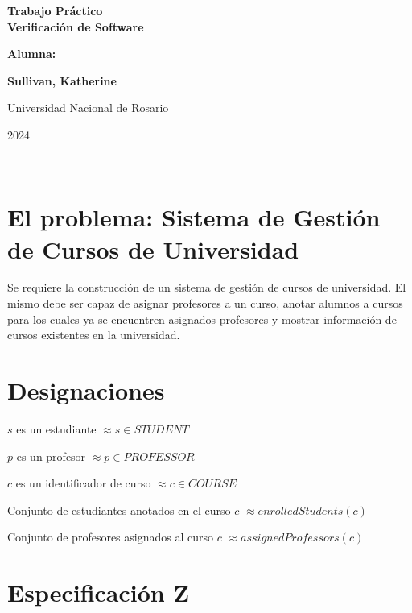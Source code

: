 \documentclass{article}
\newcommand{\desig}[2]{\item #1 $\approx #2$}
\newenvironment{designations}
  {\begin{leftbar}
    \begin{list}{}{\setlength{\labelsep}{0cm}
                   \setlength{\labelwidth}{0cm}
                   \setlength{\listparindent}{0cm}
                   \setlength{\rightmargin}{\leftmargin}}}
  {\end{list}\end{leftbar}}
\begin{document}
\begin{titlepage}
    \begin{center}
        \vfill
        \vfill
            \vspace{0.7cm}
            \noindent\textbf{\Huge Trabajo Práctico \\ Verificación de Software}\par
            \vspace{.5cm}
        \vfill
        \noindent \textbf{\huge Alumna:}\par
        \vspace{.5cm}
        \noindent \textbf{\Large Sullivan, Katherine}\par
 
        \vfill
        \large Universidad Nacional de Rosario \par
        \noindent\large 2024
    \end{center}
\end{titlepage}
\ \par

\vspace{-2cm}

\section*{El problema: Sistema de Gestión de Cursos de Universidad}

Se requiere la construcción de un sistema de gestión de cursos de universidad. El mismo debe ser capaz de asignar profesores a un curso, anotar alumnos a cursos para los cuales ya se encuentren asignados profesores y mostrar información de cursos existentes en la universidad.

\section*{Designaciones}

\begin{designations}
\desig{$s$ es un estudiante}{s \in STUDENT}
\desig{$p$ es un profesor}{p \in PROFESSOR}
\desig{$c$ es un identificador de curso}{c \in COURSE}
\desig{Conjunto de estudiantes anotados en el curso $c$}{enrolledStudents(c)}
\desig{Conjunto de profesores asignados al curso $c$}{assignedProfessors(c)}
\end{designations}

\section*{Especificación Z}
\end{document}

